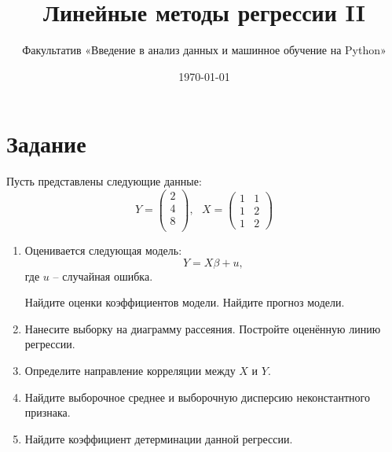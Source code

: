 \documentclass[11pt, a4paper]{extarticle}
\title{Линейные методы регрессии II}
\author{Факультатив «Введение в анализ данных и машинное обучение на Python»}
\date{\today}
\begin{document}
	
	\maketitle
	
\section*{Задание}
Пусть представлены следующие данные:
\[
Y = \begin{pmatrix}
2 \\
4 \\
8 \\
\end{pmatrix}, \text{ } X = \begin{pmatrix}
1 & 1 \\
1 & 2 \\
1 & 2
\end{pmatrix}
\]
\begin{enumerate}[label=\alph*)]
	\item Оценивается следующая модель:
	\[Y = X\beta + u,\]
	где $u$ – случайная ошибка.
	
	Найдите оценки коэффициентов модели. Найдите прогноз модели.
	\item Нанесите выборку на диаграмму рассеяния. Постройте оценённую линию регрессии. 
	\item Определите направление корреляции между $X$ и $Y$.
	\item Найдите выборочное среднее и выборочную дисперсию неконстантного признака.  
	\item Найдите коэффициент детерминации данной регрессии. 
\end{enumerate}
\end{document}
